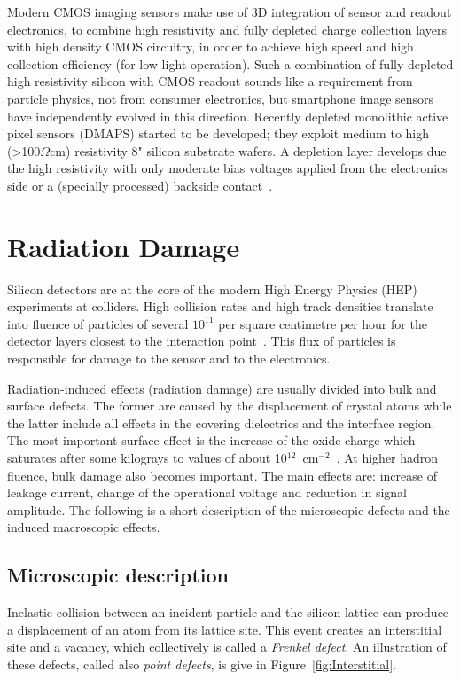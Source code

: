 Modern CMOS imaging sensors make use of 3D integration of sensor and readout electronics, to combine high resistivity and 
fully depleted charge collection layers with high density CMOS circuitry, in order to achieve high speed 
and high collection efficiency (for low light operation). Such a combination of fully depleted high 
resistivity silicon with CMOS readout sounds like a requirement from particle physics, not from 
consumer electronics, but smartphone image sensors have independently evolved in this 
direction. Recently depleted monolithic active pixel sensors 
(DMAPS) started to be developed; they exploit medium to high (>100$\Omega$cm) resistivity 8" silicon substrate wafers. A depletion layer develops due the high resistivity with only moderate bias voltages applied from the electronics side or a (specially processed) backside 
contact~\cite{Garcia-Sciveres:2017ymt}.

\section{Radiation Damage}
\label{sec:RadDam}

Silicon detectors are at the core of the modern High Energy Physics (HEP) experiments at colliders. 
High collision rates 
and high track densities translate into fluence of particles of several $10^{11}$ per square centimetre 
per hour for the detector layers closest to the interaction point~\cite{rossi2006pixel}. This flux of 
particles is responsible for damage to the sensor and to the electronics. 

Radiation-induced effects (radiation damage) are usually divided into bulk and surface defects. The 
former are caused by the displacement of crystal atoms while the latter include all effects in the 
covering dielectrics and the interface region. The most important surface effect is the increase of the 
oxide charge which saturates after some kilograys to values of about 10$^{12}$~cm$^{-2}$~\cite{Oldham}. 
At higher hadron fluence, bulk damage also becomes important. The main effects are: increase of 
leakage current, change of the operational voltage and reduction in signal amplitude. 
The following is a short description of the microscopic defects and the induced macroscopic effects.

\subsection{Microscopic description}
Inelastic collision between an incident particle and the silicon lattice can produce a displacement 
of an atom from its lattice site. This event creates an interstitial site and a vacancy, which 
collectively is called a {\it Frenkel defect}. An illustration of these defects, called also {\it point defects}, 
is give in Figure~\ref{fig:Interstitial}.


